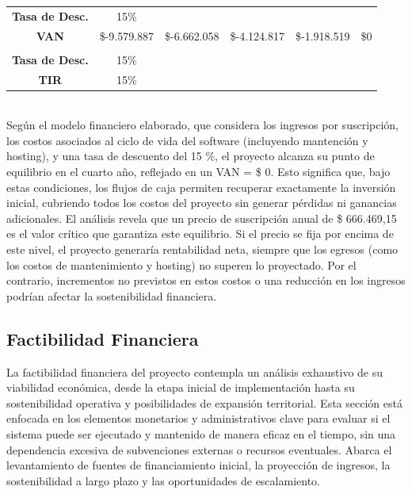 \documentclass[12pt]{article}
\begin{document}
\begin{table}[!h]
\begin{tabular}{|c|c|c|c|c|c|}
         \hline
         &&&&&\\
         \hline
         \textbf{Tasa de Desc.} & 15\% &&&&\\
         \hline
         \textbf{VAN}&\$-9.579.887 &\$-6.662.058 &\$-4.124.817 &\$-1.918.519&\$0\\
         \hline
         &&&&&\\
         \hline
         \textbf{Tasa de Desc.} & 15\% &&&&\\
         \hline
         \textbf{TIR} & 15\% & & & &\\
         \hline
    \end{tabular}
\end{table}\\
Según el modelo financiero elaborado, que considera los ingresos por suscripción, los costos asociados al ciclo de vida del software (incluyendo mantención y hosting), y una tasa de descuento del 15 \%, el proyecto alcanza su punto de equilibrio en el cuarto año, reflejado en un VAN = \$ 0. Esto significa que, bajo estas condiciones, los flujos de caja permiten recuperar exactamente la inversión inicial, cubriendo todos los costos del proyecto sin generar pérdidas ni ganancias adicionales.
\newpage
El análisis revela que un precio de suscripción anual de \$ 666.469,15 es el valor crítico que garantiza este equilibrio. Si el precio se fija por encima de este nivel, el proyecto generaría rentabilidad neta, siempre que los egresos (como los costos de mantenimiento y hosting) no superen lo proyectado. Por el contrario, incrementos no previstos en estos costos o una reducción en los ingresos podrían afectar la sostenibilidad financiera.

\newpage
\subsection{Factibilidad Financiera}
La factibilidad financiera del proyecto contempla un análisis exhaustivo de su viabilidad económica, desde la etapa inicial de implementación hasta su sostenibilidad operativa y posibilidades de expansión territorial. Esta sección está enfocada en los elementos monetarios y administrativos clave para evaluar si el sistema puede ser ejecutado y mantenido de manera eficaz en el tiempo, sin una dependencia excesiva de subvenciones externas o recursos eventuales. Abarca el levantamiento de fuentes de financiamiento inicial, la proyección de ingresos, la sostenibilidad a largo plazo y las oportunidades de escalamiento.
\end{document}
